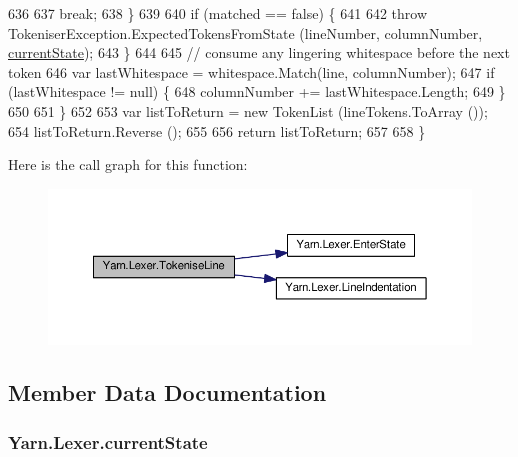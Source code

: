 \begin{DoxyCode}
636 
637                     \textcolor{keywordflow}{break};
638                 \}
639 
640                 \textcolor{keywordflow}{if} (matched == \textcolor{keyword}{false}) \{
641 
642                     \textcolor{keywordflow}{throw} TokeniserException.ExpectedTokensFromState (lineNumber, columnNumber, 
      \hyperlink{a00121_ac90b7dce8103425a148f9e8588f14137}{currentState});
643                 \}
644 
645                 \textcolor{comment}{// consume any lingering whitespace before the next token}
646                 var lastWhitespace = whitespace.Match(line, columnNumber);
647                 \textcolor{keywordflow}{if} (lastWhitespace != null) \{
648                     columnNumber += lastWhitespace.Length;
649                 \}
650 
651             \}
652 
653             var listToReturn = \textcolor{keyword}{new} TokenList (lineTokens.ToArray ());
654             listToReturn.Reverse ();
655 
656             \textcolor{keywordflow}{return} listToReturn;
657 
658         \}
\end{DoxyCode}


Here is the call graph for this function\-:
\nopagebreak
\begin{figure}[H]
\begin{center}
\leavevmode
\includegraphics[width=350pt]{a00121_a20b63f6ef434f6a40fd388f262f03fa8_cgraph}
\end{center}
\end{figure}




\subsection{Member Data Documentation}
\hypertarget{a00121_ac90b7dce8103425a148f9e8588f14137}{
\subsubsection[{current\-State}]{ Yarn.\-Lexer.\-current\-State\hspace{0.3cm}{\ttfamily [private]}}}\label{a00121_ac90b7dce8103425a148f9e8588f14137}


